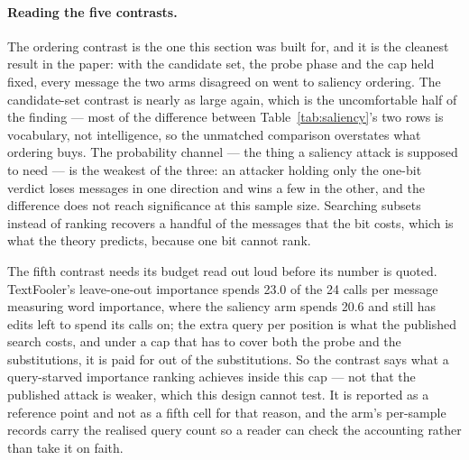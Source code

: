 
\paragraph{Reading the five contrasts.} The ordering contrast is the one this
section was built for, and it is the cleanest result in the paper: with the
candidate set, the probe phase and the cap held fixed, every message the two arms
disagreed on went to saliency ordering. The candidate-set contrast is nearly as
large again, which is the uncomfortable half of the finding --- most of the
difference between Table~\ref{tab:saliency}'s two rows is vocabulary, not
intelligence, so the unmatched comparison overstates what ordering buys.
The probability channel --- the thing a saliency attack is supposed to need ---
is the weakest of the three: an attacker holding only the one-bit verdict loses
messages in one direction and wins a few in the other, and the difference does
not reach significance at this sample size. Searching subsets instead of ranking
recovers a handful of the messages that the bit costs, which is what the theory
predicts, because one bit cannot rank.

The fifth contrast needs its budget read out loud before its number is quoted.
TextFooler's leave-one-out importance spends 23.0 of the 24 calls per message
measuring word importance, where the saliency arm spends 20.6 and still has
edits left to spend its calls on; the extra query per position is what the
published search costs, and under a cap that has to cover both the probe and the
substitutions, it is paid for out of the substitutions. So the contrast says what
a query-starved importance ranking achieves inside this cap --- not that the
published attack is weaker, which this design cannot test. It is reported as a
reference point and not as a fifth cell for that reason, and the arm's per-sample
records carry the realised query count so a reader can check the accounting
rather than take it on faith.
